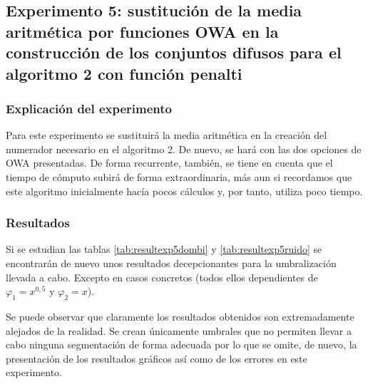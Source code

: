 \documentclass[main]{subfiles}
\begin{document}
\subsection{Experimento 5: sustitución de la media aritmética por funciones OWA en la construcción de los conjuntos difusos para el algoritmo 2 con función penalti}

\subsubsection{Explicación del experimento}
Para este experimento se sustituirá la media aritmética en la creación del numerador necesario en el algoritmo 2. De nuevo, se hará con las dos opciones de OWA presentadas. De forma recurrente, también, se tiene en cuenta que el tiempo de cómputo subirá de forma extraordinaria, más aun si recordamos que este algoritmo inicialmente hacía pocos cálculos y, por tanto, utiliza poco tiempo.

\subsubsection{Resultados}

Si se estudian las tablas \ref{tab:resultexp5dombi} y \ref{tab:resultexp5ruido} se encontrarán de nuevo unos resultados decepcionantes para la umbralización llevada a cabo. Excepto en casos concretos (todos ellos dependientes de $\varphi_1=x^{0,5} \text{ y }\varphi_2=x$).

Se puede observar que claramente los resultados obtenidos son extremadamente alejados de la realidad. Se crean únicamente umbrales que no permiten llevar a cabo ninguna segmentación de forma adecuada por lo que se omite, de nuevo, la presentación de los resultados gráficos así como de los errores en este experimento.
\end{document}
